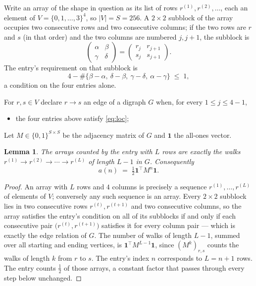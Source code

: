 \documentclass[11pt,a4paper]{article}
\theoremstyle{plain}
\newtheorem{lemma}[theorem]{Lemma}
\theoremstyle{definition}
\begin{document}
Write an array of the shape in question as its list of rows
$r^{(1)},r^{(2)},\dots$, each an element of
$V=\{0,1,\dots,3\}^{4}$, so $|V|=S=256$. A $2\times2$ subblock of the array
occupies two consecutive rows and two consecutive columns; if the two rows are $r$
and $s$ (in that order) and the two columns are numbered $j,j+1$,
the subblock is
\[
\begin{pmatrix}\alpha&\beta\\\gamma&\delta\end{pmatrix}=\begin{pmatrix}r_j&r_{j+1}\\s_j&s_{j+1}\end{pmatrix}.
\]
The entry's requirement on that subblock is
\begin{equation}\label{eq:loc}
4-\#\{\beta-\alpha,\ \delta-\beta,\ \gamma-\delta,\ \alpha-\gamma\}\;\le\;1,
\end{equation}
a condition on the four entries alone.

For $r,s\in V$ declare $r\to s$ an edge of a digraph $G$ when, for every
$1\le j\le 4-1$,
\begin{itemize}
\item the four entries above satisfy \eqref{eq:loc};

\end{itemize}
Let $M\in\{0,1\}^{S\times S}$ be the adjacency matrix of $G$ and $\mathbf{1}$ the
all-ones vector.

\begin{lemma}\label{lem:walk}
The arrays counted by the entry with $L$ rows are exactly the walks
$r^{(1)}\to r^{(2)}\to\cdots\to r^{(L)}$ of length $L-1$ in $G$. Consequently
\[
a(n)\;=\;\tfrac1{2}\mathbf{1}^{\!\top}M^{n}\mathbf{1} .
\]
\end{lemma}

\begin{proof}
An array with $L$ rows and $4$ columns is precisely a sequence
$r^{(1)},\dots,r^{(L)}$ of elements of $V$; conversely any such sequence is an array.
Every $2\times2$ subblock lies in two consecutive rows $r^{(t)},r^{(t+1)}$ and two
consecutive columns, so the array satisfies the entry's condition on all of its subblocks
if and only if each consecutive pair $\bigl(r^{(t)},r^{(t+1)}\bigr)$ satisfies it for
every column pair --- which is exactly the edge relation of $G$. The number of walks of
length $L-1$, summed over all starting and ending vertices, is
$\mathbf{1}^{\!\top}M^{L-1}\mathbf{1}$, since $(M^{k})_{r,s}$ counts the walks of
length $k$ from $r$ to $s$. The entry's index $n$ corresponds to $L=n+1$ rows. The entry counts $\tfrac1{2}$ of those arrays, a constant factor that passes through every step below unchanged.
\end{proof}
\end{document}
